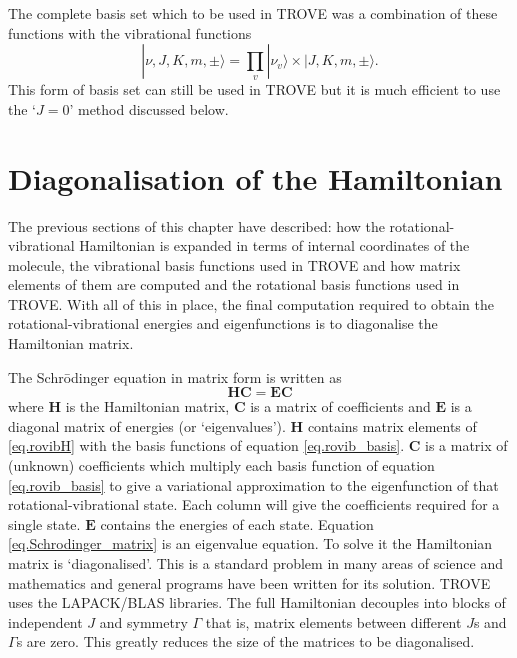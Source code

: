 The complete basis set which to be used in TROVE was a combination of these functions with the vibrational functions
\begin{equation}
\label{eq.rovib_basis}
|\nu,J,K,m,\pm \rangle = \prod_{v} |\nu _v \rangle \times |J,K,m,\pm \rangle.
\end{equation}
This form of basis set can still be used in TROVE but it is much efficient to use the `$J=0$' method discussed below.


\section{Diagonalisation of the Hamiltonian}

The previous sections of this chapter have described: how the rotational-vibrational Hamiltonian is expanded in terms 
of internal coordinates of the molecule, the vibrational basis functions used in TROVE and how matrix elements of them
are computed and the rotational basis functions used in TROVE. With all of this in place, the final computation required
to obtain the rotational-vibrational energies and eigenfunctions is to diagonalise the Hamiltonian matrix.

The Schr\={o}dinger equation in matrix form is written as 
\begin{equation}
\label{eq.Schrodinger_matrix}
\mathbf{H}\mathbf{C} = \mathbf{E}\mathbf{C}
\end{equation}
where $\mathbf{H}$ is the Hamiltonian matrix, $\mathbf{C}$ is a matrix of coefficients and $\mathbf{E}$ is a diagonal
matrix of energies (or `eigenvalues'). $\mathbf{H}$ contains matrix elements of \ref{eq.rovibH} with the basis functions
of equation \ref{eq.rovib_basis}. $\mathbf{C}$ is a matrix of (unknown) coefficients which multiply each basis function
of equation \ref{eq.rovib_basis} to give a variational approximation to the eigenfunction of that rotational-vibrational state.
 Each column will give the coefficients required for a single state. $\mathbf{E}$ contains the energies of each state. Equation
\ref{eq.Schrodinger_matrix} is an eigenvalue equation. To solve it the Hamiltonian matrix is `diagonalised'. This is a 
standard problem in many areas of science and mathematics and general programs have been written for its solution. TROVE
uses the LAPACK/BLAS libraries. The full Hamiltonian decouples into blocks of independent $J$ and symmetry $\Gamma$ that is, matrix elements between different $J$s and $\Gamma$s are zero. This greatly reduces the size of the matrices to 
be diagonalised.

